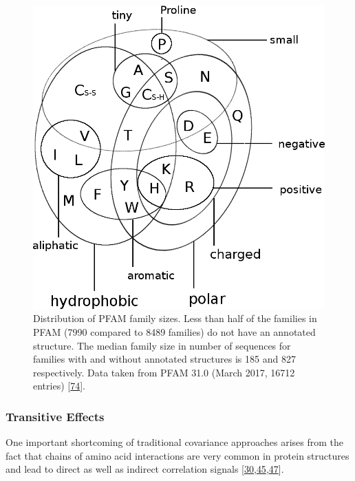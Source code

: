 \documentclass[12pt,a4paper,twoside]{book}
\theoremstyle{definition}
\theoremstyle{definition}
\theoremstyle{remark}
\begin{document}
\begin{figure}
\includegraphics[width=1\linewidth]{img/amino_acid_physico_chemical_properties_venn_diagramm} \caption{Distribution of PFAM family sizes. Less than half of
the families in PFAM (7990 compared to 8489 families) do not have an
annotated structure. The median family size in number of sequences for
families with and without annotated structures is 185 and 827
respectively. Data taken from PFAM 31.0 (March 2017, 16712 entries)
{[}\protect\hyperlink{ref-Finn2016}{74}{]}.}\label{fig:pfam}
\end{figure}

\hypertarget{transitive-effects}{\subsubsection*{Transitive
Effects}\label{transitive-effects}}

One important shortcoming of traditional covariance approaches arises
from the fact that chains of amino acid interactions are very common in
protein structures and lead to direct as well as indirect correlation
signals
{[}\protect\hyperlink{ref-Weigt2009}{30},\protect\hyperlink{ref-Lapedes1999}{45},\protect\hyperlink{ref-Burger2010}{47}{]}.
\end{document}
